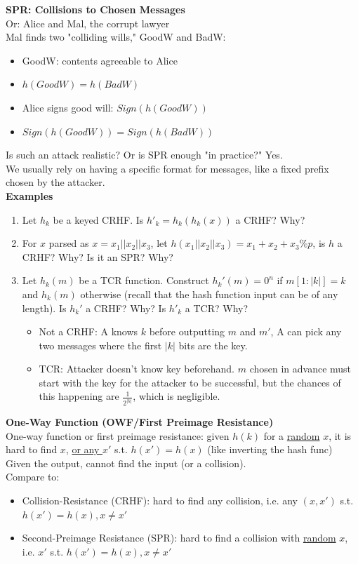 \documentclass{article}
\begin{document}
\textbf{SPR: Collisions to Chosen Messages}\\
Or: Alice and Mal, the corrupt lawyer\\
Mal finds two "colliding wills," GoodW and BadW:\begin{itemize}
	\item GoodW: contents agreeable to Alice
	\item $h(GoodW)=h(BadW)$
	\item Alice signs good will: $Sign(h(GoodW))$
	\item $Sign(h(GoodW))=Sign(h(BadW))$
\end{itemize}
Is such an attack realistic? Or is SPR enough "in practice?" Yes.\\
We usually rely on having a specific format for messages, like a fixed prefix chosen by the attacker.\\

\textbf{Examples}
\begin{enumerate}
	\item Let $h_k$ be a keyed CRHF. Is $h'_k=h_k(h_k(x))$ a CRHF? Why?
	\item For $x$ parsed as $x=x_1||x_2||x_3$, let $h(x_1||x_2||x_3)=x_1+x_2+x_3 \% p$, is $h$ a CRHF? Why? Is it an SPR? Why?
	\item Let $h_k(m)$ be a TCR function. Construct $h_k'(m)=0^n$ if $m[1:|k|]=k$ and $h_k(m)$ otherwise (recall that the hash function input can be of any length). Is $h_k'$ a CRHF? Why? Is $h'_k$ a TCR? Why?
		\begin{itemize}
			\item Not a CRHF: A knows $k$ before outputting $m$ and $m'$, A can pick any two messages where the first $|k|$ bits are the key.
			\item TCR: Attacker doesn't know key beforehand. $m$ chosen in advance must start with the key for the attacker to be successful, but the chances of this happening are $\frac{1}{2^{|k|}}$, which is negligible.
		\end{itemize}
\end{enumerate}

\textbf{One-Way Function (OWF/First Preimage Resistance)}\\
One-way function or first preimage resistance: given $h(k)$ for a \underline{random} $x$, it is hard to find $x$, \underline{or any $x'$} s.t. $h(x')=h(x)$ (like inverting the hash func)\\ 
Given the output, cannot find the input (or a collision).\\
Compare to:\begin{itemize}
	\item Collision-Resistance (CRHF): hard to find any collision, i.e. any $(x,x')$ s.t. $h(x')=h(x), x\neq x'$
	\item Second-Preimage Resistance (SPR): hard to find a collision with \underline{random} $x$, i.e. $x'$ s.t. $h(x')=h(x), x\neq x'$
\end{itemize}
\end{document}
